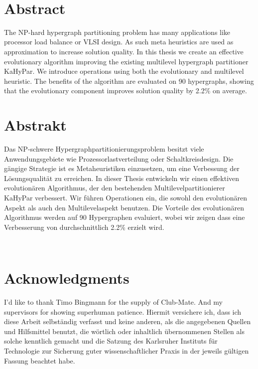 \documentclass[a4paper,12pt,titlepage, BCOR7mm,headsepline]{scrbook}
\numberwithin{equation}{section}
\begin{document}

\ 
\newpage
\clearpage

\section*{Abstract}
The NP-hard hypergraph partitioning problem has many applications like processor load balance or VLSI design. As such meta heuristics are used as approximation to increase solution quality. In this thesis we create an effective evolutionary algorithm 
improving the existing multilevel hypergraph partitioner KaHyPar. We introduce operations using both the evolutionary and multilevel heuristic. The benefits of the algorithm are evaluated on 90 hypergraphs, showing that the evolutionary component improves solution quality by 2.2\% on average.



\section*{Abstrakt}
Das NP-schwere Hypergraphpartitionierungsproblem besitzt viele Anwendungsgebiete wie Prozessorlastverteilung oder Schaltkreisdesign. Die gängige Strategie ist es Metaheuristiken einzusetzen, um eine Verbessung der Lösungsqualität zu erreichen. In dieser Thesis entwickeln wir einen effektiven evolutionären Algorithmus, der den bestehenden Multilevelpartitionierer KaHyPar verbessert. Wir führen Operationen ein, die sowohl den evolutionären Aspekt als auch den Multilevelaspekt benutzen. Die Vorteile des evolutionären Algorithmus werden  auf 90 Hypergraphen evaluiert, wobei wir zeigen dass eine Verbesserung von durchschnittlich 2.2\% erzielt wird.




\vfill\vfill\vfill
\ 
\newpage
\clearpage
\ 
\newpage
\clearpage

\section*{Acknowledgments}

I'd like to thank Timo Bingmann for the supply of Club-Mate. And my supervisors for showing superhuman patience.
\vfill\vfill\vfill
Hiermit versichere ich, dass ich diese Arbeit selbständig verfasst und keine anderen, als die angegebenen Quellen und Hilfsmittel benutzt, die wörtlich oder inhaltlich übernommenen Stellen als solche kenntlich gemacht und die Satzung des Karlsruher Instituts für Technologie zur Sicherung guter wissenschaftlicher Praxis in der jeweils gültigen Fassung beachtet habe.
\end{document}
